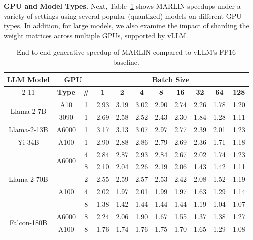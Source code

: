 \documentclass{article}
\theoremstyle{plain}
\theoremstyle{definition}
\theoremstyle{remark}
\renewcommand{\paragraph}[1]{\vspace{0.1em}\noindent\textbf{#1}}
\begin{document}
\paragraph{GPU and Model Types.} Next, Table~\ref{tab:e2e_generation_speedup} shows MARLIN speedups under a variety of settings using several popular (quantized) models on different GPU types. In addition, for large models, we also examine the impact of sharding the weight matrices across multiple GPUs, supported by vLLM. 

{
\newcommand{\tabhead}[1]{\textbf{#1}}
\begin{table}[ht]
\centering
\caption{End-to-end generative speedup of MARLIN compared to vLLM's FP16 baseline.}
\label{tab:e2e_generation_speedup}
\centering
{
\begin{tabular}{ c | c | c | c c c c c c c c }
\hline
\multirow{2}{*}{\tabhead{LLM Model}} & \multicolumn{2}{c|}{\tabhead{GPU}} & \multicolumn{8}{c}{\tabhead{Batch Size}} \\
\cline{2-11}
& \tabhead{Type} & \tabhead{\#} & \tabhead{1} & \tabhead{2} & \tabhead{4} & \tabhead{8} & \tabhead{16} & \tabhead{32} & \tabhead{64} & \tabhead{128} \\
\hline
\multirow{2}{*}{Llama-2-7B} & \multirow{1}{*}{A10} & 1 & 2.93 & 3.19 & 3.02 & 2.90 & 2.74 & 2.26 & 1.78 & 1.20 \\
\cline{2-11}
& \multirow{1}{*}{3090} & 1 & 2.69 & 2.58 & 2.52 & 2.43 & 2.30 & 1.84 & 1.28 & 1.11 \\
 \hline
\multirow{1}{*}{Llama-2-13B} & \multirow{1}{*}{A6000} & 1 & 3.17 & 3.13 & 3.07 & 2.97 & 2.77 & 2.39 & 2.01 & 1.23 \\
\hline
\multirow{1}{*}{Yi-34B} & \multirow{1}{*}{A100} & 1 & 2.90 & 2.88 & 2.86 & 2.79 & 2.69 & 2.36 & 1.71 & 1.18 \\
\hline
\multirow{5}{*}{Llama-2-70B} & \multirow{2}{*}{A6000} & 4 & 2.84 & 2.87 & 2.93 & 2.84 & 2.67 & 2.02 & 1.74 & 1.23 \\
& & 8 & 2.10 & 2.04 & 2.26 & 2.19 & 2.06 & 1.43 & 1.42 & 1.11 \\
\cline{2-11}
& \multirow{3}{*}{A100} & 2 & 2.55 & 2.59 & 2.57 & 2.53 & 2.42 & 2.08 & 1.52 & 1.19 \\
& & 4 & 2.02 & 1.97 & 2.01 & 1.99 & 1.97 & 1.63 & 1.29 & 1.14 \\
& & 8 & 1.38 & 1.42 & 1.44 & 1.44 & 1.44 & 1.19 & 1.04 & 1.07 \\
\hline
\multirow{2}{*}{Falcon-180B} & \multirow{1}{*}{A6000} & 8 & 2.24 & 2.06 & 1.90 & 1.67 & 1.55 & 1.37 & 1.38 & 1.27 \\
\cline{2-11}
& \multirow{1}{*}{A100} & 8 & 1.76 & 1.74 & 1.76 & 1.75 & 1.70 & 1.65 & 1.29 & 1.08 \\
\hline
\end{tabular}
}
\end{table}
}
\end{document}
